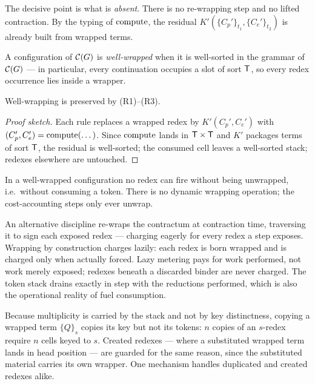 The decisive point is what is \emph{absent}. There is no re-wrapping step and no lifted
contraction. By the typing of $\mathrm{compute}$, the residual $K'(\{C_p'\}_{t_1},
\{C_e'\}_{t_2})$ is already built from wrapped terms.

\begin{definition}
A configuration of $\mathcal{C}(G)$ is \emph{well-wrapped} when it is well-sorted in the
grammar of $\mathcal{C}(G)$ --- in particular, every continuation occupies a slot of sort
$\mathsf{T}$, so every redex occurrence lies inside a wrapper.
\end{definition}

\begin{lemma}
Well-wrapping is preserved by (R1)--(R3).
\end{lemma}

\begin{proof}[Proof sketch]
Each rule replaces a wrapped redex by $K'(C_p',C_e')$ with $(C_p',C_e') = \mathrm{compute}(\dots)$.
Since $\mathrm{compute}$ lands in $\mathsf{T} \times \mathsf{T}$ and $K'$ packages terms of sort $\mathsf{T}$, the
residual is well-sorted; the consumed cell leaves a well-sorted stack; redexes elsewhere
are untouched.
\end{proof}

\begin{corollary}
In a well-wrapped configuration no redex can fire without being unwrapped, i.e.\ without
consuming a token. There is no dynamic wrapping operation; the cost-accounting steps only
ever unwrap.
\end{corollary}

\begin{remark}
An alternative discipline re-wraps the contractum at contraction time, traversing it to
sign each exposed redex --- charging eagerly for every redex a step exposes. Wrapping by
construction charges lazily: each redex is born wrapped and is charged only when actually
forced. Lazy metering pays for work performed, not work merely exposed; redexes beneath a
discarded binder are never charged. The token stack drains exactly in step with the
reductions performed, which is also the operational reality of fuel consumption.
\end{remark}

\begin{remark}
Because multiplicity is carried by the stack and not by key distinctness, copying a
wrapped term $\{Q\}_s$ copies its key but not its tokens: $n$ copies of an $s$-redex
require $n$ cells keyed to $s$. Created redexes --- where a substituted wrapped term
lands in head position --- are guarded for the same reason, since the substituted
material carries its own wrapper. One mechanism handles duplicated and created redexes
alike.
\end{remark}


